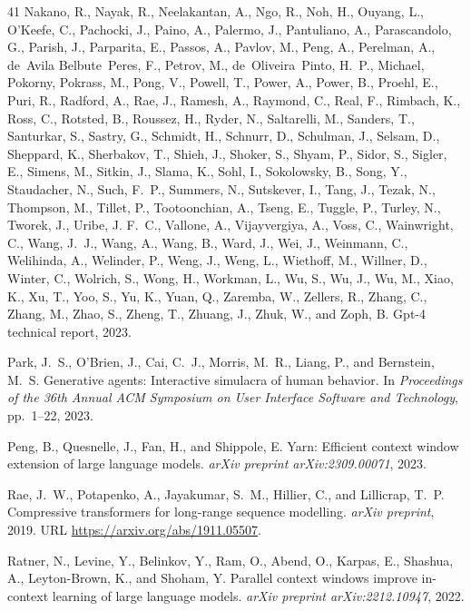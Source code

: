 \documentclass{article}
\theoremstyle{plain}
\theoremstyle{definition}
\theoremstyle{remark}
\begin{document}
\begin{thebibliography}{41}
  Nakano, R., Nayak, R., Neelakantan, A., Ngo, R., Noh, H., Ouyang, L.,
  O'Keefe, C., Pachocki, J., Paino, A., Palermo, J., Pantuliano, A.,
  Parascandolo, G., Parish, J., Parparita, E., Passos, A., Pavlov, M., Peng,
  A., Perelman, A., de~Avila Belbute~Peres, F., Petrov, M., de~Oliveira~Pinto,
  H.~P., Michael, Pokorny, Pokrass, M., Pong, V., Powell, T., Power, A., Power,
  B., Proehl, E., Puri, R., Radford, A., Rae, J., Ramesh, A., Raymond, C.,
  Real, F., Rimbach, K., Ross, C., Rotsted, B., Roussez, H., Ryder, N.,
  Saltarelli, M., Sanders, T., Santurkar, S., Sastry, G., Schmidt, H., Schnurr,
  D., Schulman, J., Selsam, D., Sheppard, K., Sherbakov, T., Shieh, J., Shoker,
  S., Shyam, P., Sidor, S., Sigler, E., Simens, M., Sitkin, J., Slama, K.,
  Sohl, I., Sokolowsky, B., Song, Y., Staudacher, N., Such, F.~P., Summers, N.,
  Sutskever, I., Tang, J., Tezak, N., Thompson, M., Tillet, P., Tootoonchian,
  A., Tseng, E., Tuggle, P., Turley, N., Tworek, J., Uribe, J. F.~C., Vallone,
  A., Vijayvergiya, A., Voss, C., Wainwright, C., Wang, J.~J., Wang, A., Wang,
  B., Ward, J., Wei, J., Weinmann, C., Welihinda, A., Welinder, P., Weng, J.,
  Weng, L., Wiethoff, M., Willner, D., Winter, C., Wolrich, S., Wong, H.,
  Workman, L., Wu, S., Wu, J., Wu, M., Xiao, K., Xu, T., Yoo, S., Yu, K., Yuan,
  Q., Zaremba, W., Zellers, R., Zhang, C., Zhang, M., Zhao, S., Zheng, T.,
  Zhuang, J., Zhuk, W., and Zoph, B.
\newblock Gpt-4 technical report, 2023.

Park, J.~S., O'Brien, J., Cai, C.~J., Morris, M.~R., Liang, P., and Bernstein,
  M.~S.
\newblock Generative agents: Interactive simulacra of human behavior.
\newblock In \emph{Proceedings of the 36th Annual ACM Symposium on User
  Interface Software and Technology}, pp.\  1--22, 2023.

Peng, B., Quesnelle, J., Fan, H., and Shippole, E.
\newblock Yarn: Efficient context window extension of large language models.
\newblock \emph{arXiv preprint arXiv:2309.00071}, 2023.

Rae, J.~W., Potapenko, A., Jayakumar, S.~M., Hillier, C., and Lillicrap, T.~P.
\newblock Compressive transformers for long-range sequence modelling.
\newblock \emph{arXiv preprint}, 2019.
\newblock URL \url{https://arxiv.org/abs/1911.05507}.

Ratner, N., Levine, Y., Belinkov, Y., Ram, O., Abend, O., Karpas, E., Shashua,
  A., Leyton-Brown, K., and Shoham, Y.
\newblock Parallel context windows improve in-context learning of large
  language models.
\newblock \emph{arXiv preprint arXiv:2212.10947}, 2022.


\end{thebibliography}
\end{document}
